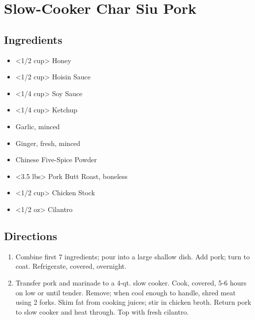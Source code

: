 \section{Slow-Cooker Char Siu Pork}

\subsection{ Ingredients }

\begin{itemize}
  \item <1/2 cup> Honey
  \item <1/2 cup> Hoisin Sauce
  \item <1/4 cup> Soy Sauce
  \item <1/4 cup> Ketchup
  \item <4 cloves> Garlic, minced
  \item <4 tsp> Ginger, fresh, minced
  \item <1 tsp> Chinese Five-Spice Powder
  \item <3.5 lbs> Pork Butt Roast, boneless
  \item <1/2 cup> Chicken Stock
  \item <1/2 oz> Cilantro
\end{itemize}

\subsection{ Directions }

\begin{enumerate}
  \item Combine first 7 ingredients; pour into a large shallow dish. Add pork; turn to coat. Refrigerate, covered, overnight.
  \item Transfer pork and marinade to a 4-qt. slow cooker. Cook, covered, 5-6 hours on low or until tender. Remove; when cool enough to handle, shred meat using 2 forks. Skim fat from cooking juices; stir in chicken broth. Return pork to slow cooker and heat through. Top with fresh cilantro.
\end{enumerate}
